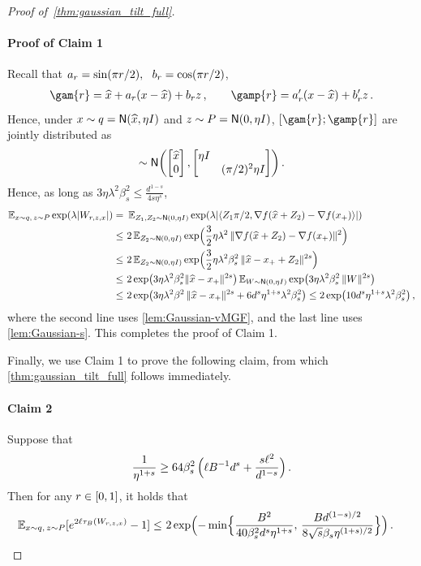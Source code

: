 \begin{proof}[Proof of~\cref{thm:gaussian_tilt_full}]
\paragraph{Proof of Claim 1}
Recall that $\alr=\sin(\pi\lr/2), ~~\blr=\cos(\pi\lr/2)$, 
\begin{align*}
    \gam{\lr}=\xhat+\alr (x-\xhat) + \blr z\,, \qquad
    \gamp{\lr}=\alrp (x -\xhat) + \blrp z\,.
\end{align*}
Hence, under $x\sim q=\normal{\xhat,\eta\Id}$ and $z\sim P=\normal{0,\eta\Id}$, $[\gam{\lr};\gamp{\lr}]$ are jointly distributed as
\begin{align*}
    [\gam{\lr};\gamp{\lr}]\sim \normal{\begin{bmatrix} \xhat \\ 0 \end{bmatrix}, \begin{bmatrix} \eta\Id &  \\ & (\pi/2)^2\eta\Id \end{bmatrix}
    }\,.
\end{align*}
Hence, as long as $3\eta\lambda^2\beta_s^2\leq \frac{d^{1-s}}{4s\eta^s}$,
\begin{align*}
    \En_{x\sim q,\,z\sim P}\exp\prn*{\lambda \abs{W_{r,z,x}}}
    =&~\En_{Z_1,Z_2\sim \normal{0,\eta\Id}}\exp\prn*{\lambda\abs{\tri{Z_1\pi/2, \nabla f(\xhat+Z_2)-\nabla f(\xp)}}} \\
    \leq&~ 2\En_{Z_2\sim \normal{0,\eta\Id}}\exp\prn[\Big]{\frac{3}{2}\eta\lambda^2\,\nrm{\nabla f(\xhat+Z_2)-\nabla f(\xp)}^2} \\
    \leq&~ 2\En_{Z_2\sim \normal{0,\eta\Id}}\exp\prn[\Big]{\frac{3}{2}\eta\lambda^2\beta_s^2\,\nrm{\xhat-\xp+Z_2}^{2s}} \\
    \leq&~ 2\exp\prn*{3\eta\lambda^2\beta_s^2\nrm{\xhat-\xp}^{2s}}\En_{W\sim \normal{0,\eta\Id}}\exp\prn*{3\eta\lambda^2\beta_s^2\,\nrm{W}^{2s}} \\
    \leq&~ 2\exp\prn[\big]{3\eta\lambda^2\beta^2\,\nrm{\xhat-\xp}^{2s}+6d^s\eta^{1+s}\lambda^2\beta_s^2}
    \leq 2\exp\prn[\big]{10d^s\eta^{1+s}\lambda^2\beta_s^2}\,,
\end{align*}
where the second line uses \cref{lem:Gaussian-vMGF}, and the last line uses \cref{lem:Gaussian-s}. This completes the proof of Claim 1.%

Finally, we use Claim 1 to prove the following claim, from which \cref{thm:gaussian_tilt_full} follows immediately.

\paragraph{Claim 2}
Suppose that 
\begin{align*}
    \frac{1}{\eta^{1+s}}\geq 64\beta_s^2\,\prn[\Big]{\ell B^{-1} d^s+\frac{s\ell^2}{d^{1-s}}}\,.
\end{align*}
Then for any $\lr\in[0,1]$, it holds that
\begin{align*}
    \En_{x\sim q,\, z\sim P}\brk{e^{2\ell\trunc{W_{r,z,x}}}-1}
    \leq&~ 2\exp\prn[\Big]{-\min\crl[\Big]{\frac{\B^2}{40\beta_s^2d^s\eta^{1+s}},\, \frac{Bd^{(1-s)/2}}{8\sqrt{s}\beta_s\eta^{(1+s)/2}}}}\,.
\end{align*}


\end{proof}
